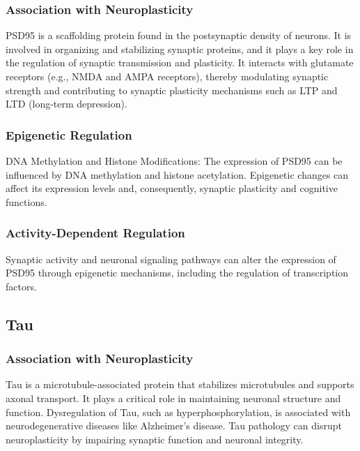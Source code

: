 \documentclass[
]{agujournal2019}
\begin{document}
\subsubsection{Association with
Neuroplasticity}\label{association-with-neuroplasticity-1}

PSD95 is a scaffolding protein found in the postsynaptic density of
neurons. It is involved in organizing and stabilizing synaptic proteins,
and it plays a key role in the regulation of synaptic transmission and
plasticity. It interacts with glutamate receptors (e.g., NMDA and AMPA
receptors), thereby modulating synaptic strength and contributing to
synaptic plasticity mechanisms such as LTP and LTD (long-term
depression).

\subsubsection{Epigenetic Regulation}\label{epigenetic-regulation-1}

DNA Methylation and Histone Modifications: The expression of PSD95 can
be influenced by DNA methylation and histone acetylation. Epigenetic
changes can affect its expression levels and, consequently, synaptic
plasticity and cognitive functions.

\subsubsection{Activity-Dependent
Regulation}\label{activity-dependent-regulation}

Synaptic activity and neuronal signaling pathways can alter the
expression of PSD95 through epigenetic mechanisms, including the
regulation of transcription factors.

\subsection{Tau}\label{tau}

\subsubsection{Association with
Neuroplasticity}\label{association-with-neuroplasticity-2}

Tau is a microtubule-associated protein that stabilizes microtubules and
supports axonal transport. It plays a critical role in maintaining
neuronal structure and function. Dysregulation of Tau, such as
hyperphosphorylation, is associated with neurodegenerative diseases like
Alzheimer's disease. Tau pathology can disrupt neuroplasticity by
impairing synaptic function and neuronal integrity.
\end{document}
